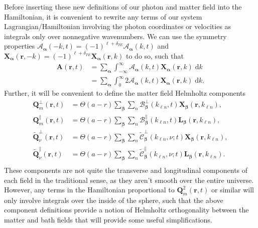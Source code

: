 \documentclass{article}
\begin{document}
Before inserting these new definitions of our photon and matter field into the Hamiltonian, it is convenient to rewrite any terms of our system Lagrangian/Hamiltonian involving the photon coordinates or velocities as integrals only over nonnegative wavenumbers. We can use the symmetry properties $\mathcal{A}_{\bm{\alpha}}(-k,t) = (-1)^{\ell + \delta_{TE}}\mathcal{A}_{\bm{\alpha}}(k,t)$ and $\mathbf{X}_{\bm{\alpha}}(\mathbf{r},-k) = (-1)^{\ell + \delta_{TE}}\mathbf{X}_{\bm{\alpha}}(\mathbf{r},k)$ to do so, such that
\begin{equation}
\begin{split}
\mathbf{A}(\mathbf{r},t) &= \sum_{\bm{\alpha}}\int_{-\infty}^\infty\mathcal{A}_{\bm{\alpha}}(k,t)\mathbf{X}_{\bm{\alpha}}(\mathbf{r},k)\;\mathrm{d}k\\
&= \sum_{\bm{\alpha}}\int_{0}^\infty2\mathcal{A}_{\bm{\alpha}}(k,t)\mathbf{X}_{\bm{\alpha}}(\mathbf{r},k)\;\mathrm{d}k.
\end{split}
\end{equation}
Further, it will be convenient to define the matter field Helmholtz components
\begin{equation}
\begin{split}
\mathbf{Q}_m^\perp(\mathbf{r},t) &= \Theta(a - r)\sum_{\bm{\beta}}\sum_n\mathcal{B}_{\bm{\beta}}^\perp(k_{\ell n},t)\mathbf{X}_{\bm{\beta}}(\mathbf{r},k_{\ell n}),\\
\mathbf{Q}_m^\parallel(\mathbf{r},t) &= \Theta(a - r)\sum_{\bm{\beta}}\sum_n\mathcal{B}_{\bm{\beta}}^\parallel(k_{\ell n},t)\mathbf{L}_{\bm{\beta}}(\mathbf{r},k_{\ell n}),\\
\tilde{\mathbf{Q}}_\nu^\perp(\mathbf{r},t) &= \Theta(a - r)\sum_{\bm{\beta}}\sum_n\tilde{\mathcal{C}}_{\bm{\beta}}^\perp(k_{\ell n},\nu;t)\mathbf{X}_{\bm{\beta}}(\mathbf{r},k_{\ell n}),\\
\tilde{\mathbf{Q}}_\nu^\parallel(\mathbf{r},t) &= \Theta(a - r)\sum_{\bm{\beta}}\sum_n\tilde{\mathcal{C}}_{\bm{\beta}}^\parallel(k_{\ell n},\nu;t)\mathbf{L}_{\bm{\beta}}(\mathbf{r},k_{\ell n}).\\
\end{split}
\end{equation}
These components are not quite the transverse and longitudinal components of each field in the traditional sense, as they aren't smooth over the entire universe. However, any terms in the Hamiltonian proportional to $\mathbf{Q}_m^2(\mathbf{r},t)$ or similar will only involve integrals over the inside of the sphere, such that the above component definitions provide a notion of Helmholtz orthogonality between the matter and bath fields that will provide some useful simplifications.
\end{document}
